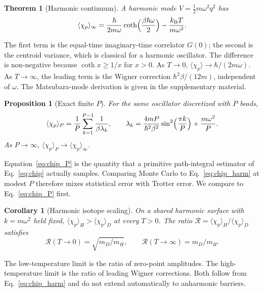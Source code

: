 \documentclass[%
 aip,
 jcp,
 amsmath,amssymb,
 reprint,
 floatfix,
]{revtex4-2}
\newtheorem{theorem}{Theorem}
\newtheorem{corollary}{Corollary}
\newtheorem{proposition}{Proposition}
\newcommand{\avg}[1]{\langle #1 \rangle}
\newcommand{\chip}{\chi_p}
\newcommand{\kB}{k_{\mathrm{B}}}
\begin{document}
\begin{theorem}[Harmonic continuum]
\label{thm:harmonic}
A harmonic mode $V=\tfrac12 m\omega^2 q^2$ has
\begin{equation}
  \avg{\chip}_{\infty}
  =
  \frac{\hbar}{2m\omega}\coth\Bigl(\frac{\beta\hbar\omega}{2}\Bigr)
  -\frac{\kB T}{m\omega^2}.
  \label{eq:chip_harm}
\end{equation}
\end{theorem}

The first term is the equal-time imaginary-time correlator $G(0)$; the second is the centroid variance, which is classical for a harmonic oscillator.\cite{cao1994} The difference is non-negative because $\coth x\ge 1/x$ for $x>0$. As $T\to 0$, $\avg{\chip}\to\hbar/(2m\omega)$. As $T\to\infty$, the leading term is the Wigner correction $\hbar^2\beta/(12m)$, independent of $\omega$.\cite{wigner1932} The Matsubara-mode derivation is given in the supplementary material.

\begin{proposition}[Exact finite $P$]
\label{prop:finiteP}
For the same oscillator discretized with $P$ beads,
\begin{equation}
  \avg{\chip}_P
  =
  \frac{1}{P}\sum_{k=1}^{P-1}
  \frac{1}{\beta\lambda_k},
  \qquad
  \lambda_k
  =
  \frac{4mP}{\hbar^2\beta^2}\sin^2\Bigl(\frac{\pi k}{P}\Bigr)
  +\frac{m\omega^2}{P}.
  \label{eq:chip_P}
\end{equation}
As $P\to\infty$, $\avg{\chip}_P\to\avg{\chip}_{\infty}$.
\end{proposition}

Equation~\eqref{eq:chip_P} is the quantity that a primitive path-integral estimator of Eq.~\eqref{eq:chip} actually samples. Comparing Monte Carlo to Eq.~\eqref{eq:chip_harm} at modest $P$ therefore mixes statistical error with Trotter error. We compare to Eq.~\eqref{eq:chip_P} first.

\begin{corollary}[Harmonic isotope scaling]
\label{cor:isotope}
On a shared harmonic surface with $k=m\omega^2$ held fixed, $\avg{\chip}_H>\avg{\chip}_D$ at every $T>0$. The ratio $\mathcal{R}=\avg{\chip}_H/\avg{\chip}_D$ satisfies
\begin{equation}
  \mathcal{R}(T\to 0)=\sqrt{m_D/m_H},
  \qquad
  \mathcal{R}(T\to\infty)=m_D/m_H.
\end{equation}
\end{corollary}

The low-temperature limit is the ratio of zero-point amplitudes. The high-temperature limit is the ratio of leading Wigner corrections. Both follow from Eq.~\eqref{eq:chip_harm} and do not extend automatically to anharmonic barriers.
\end{document}
